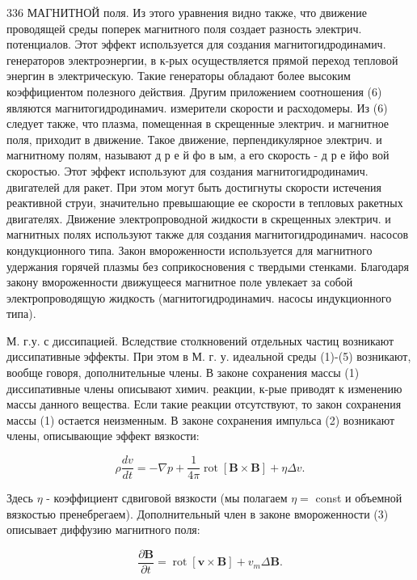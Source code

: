 \documentclass[10pt]{article}
\begin{document}
336 МАГНИТНОЙ поля. Из этого уравнения видно также, что движение проводящей среды поперек магнитного поля создает разность электрич. потенциалов. Этот эффект используется для создания магнитогидродинамич. генераторов электроэнергии, в к-рых осуществляется прямой переход тепловой энергин в электрическую. Такие генераторы обладают более высоким коэффициентом полезного действия. Другим приложением соотношения (6) являются магнитогидродинамич. измерители скорости и расходомеры. Из (6) следует также, что плазма, помещенная в скрещенные электрич. и магнитное поля, приходит в движение. Такое движение, перпендикулярное электрич. и магнитному полям, называют д р е й фо в ым, а его скорость - д р е йфо вой скоростью. Этот эффект используют для создания магнитогидродинамич. двигателей для ракет. При этом могут быть достигнуты скорости истечения реактивной струи, значительно превышающие ее скорости в тепловых ракетных двигателях. Движение электропроводной жидкости в скрещенных электрич. и магнитных полях используют также для создания магнитогидродинамич. насосов кондукционного типа. Закон вмороженности используется для магнитного удержания горячей плазмы без соприкосновения с твердыми стенками. Благодаря закону вмороженности движущееся магнитное поле увлекает за собой электропроводящую жидкость (магнитогидродинамич. насосы индукционного типа).



М. г.у. с диссипацией. Вследствие столкновений отдельных частиц возникают диссипативные эффекты. При этом в М. г. у. идеальной среды (1)-(5) возникают, вообще говоря, дополнительные члены. В законе сохранения массы (1) диссипативные члены описывают химич. реакции, к-рые приводят к изменению массы данного вещества. Если такие реакции отсутствуют, то закон сохранения массы (1) остается неизменным. В законе сохранения импульса (2) возникают члены, описывающие эффект вязкости:



\[

\rho \frac{d v}{d t}=-\nabla p+\frac{1}{4 \pi} \operatorname{rot}[\boldsymbol{B} \times \boldsymbol{B}]+\eta \Delta v .

\]



Здесь $\eta$ - коэффициент сдвиговой вязкости (мы полагаем $\eta=$ const и объемной вязкостью пренебрегаем). Дополнительный член в законе вмороженности (3) описывает диффузию магнитного поля:



\[

\frac{\partial \boldsymbol{B}}{\partial t}=\operatorname{rot}[\boldsymbol{v} \times \boldsymbol{B}]+v_{m} \Delta \boldsymbol{B} .

\]
\end{document}
